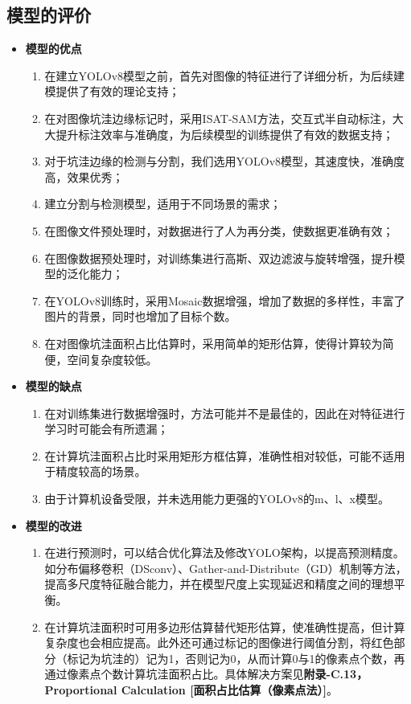 \documentclass{MathorCupmodeling}
\begin{document}
	\subsection{模型的评价}
	\begin{itemize}
		\item \textbf{模型的优点}
		\begin{enumerate}
			\item 在建立YOLOv8模型之前，首先对图像的特征进行了详细分析，为后续建模提供了有效的理论支持；
			\item 在对图像坑洼边缘标记时，采用ISAT-SAM方法，交互式半自动标注，大大提升标注效率与准确度，为后续模型的训练提供了有效的数据支持；
			\item 对于坑洼边缘的检测与分割，我们选用YOLOv8模型，其速度快，准确度高，效果优秀；
			\item 建立分割与检测模型，适用于不同场景的需求；
			\item 在图像文件预处理时，对数据进行了人为再分类，使数据更准确有效；
			\item 在图像数据预处理时，对训练集进行高斯、双边滤波与旋转增强，提升模型的泛化能力；
			\item 在YOLOv8训练时，采用Mosaic数据增强，增加了数据的多样性，丰富了图片的背景，同时也增加了目标个数。
			\item 在对图像坑洼面积占比估算时，采用简单的矩形估算，使得计算较为简便，空间复杂度较低。
		\end{enumerate}
		\item \textbf{模型的缺点}
		\begin{enumerate}
			\item 在对训练集进行数据增强时，方法可能并不是最佳的，因此在对特征进行学习时可能会有所遗漏；
			\item 在计算坑洼面积占比时采用矩形方框估算，准确性相对较低，可能不适用于精度较高的场景。
			\item 由于计算机设备受限，并未选用能力更强的YOLOv8的m、l、x模型。
		\end{enumerate}
		\item \textbf{模型的改进}\label{改进}
		\begin{enumerate}
			\item 在进行预测时，可以结合优化算法及修改YOLO架构，以提高预测精度。如分布偏移卷积（DSconv）\textcolor{blue}{\cite{Dsconv}}、Gather-and-Distribute（GD）机制\textcolor{blue}{\cite{Gold-YOLO}}等方法，提高多尺度特征融合能力，并在模型尺度上实现延迟和精度之间的理想平衡。
			\item 在计算坑洼面积时可用多边形估算替代矩形估算，使准确性提高，但计算复杂度也会相应提高。此外还可通过标记的图像进行阈值分割，将红色部分（标记为坑洼的）记为1，否则记为0，从而计算0与1的像素点个数，再通过像素点个数计算坑洼面积占比\textcolor{blue}{\cite{改进}}。具体解决方案见\textbf{附录-C.13，Proportional Calculation [面积占比估算（像素点法）]}。
		\end{enumerate}

	\end{itemize}
\end{document}

